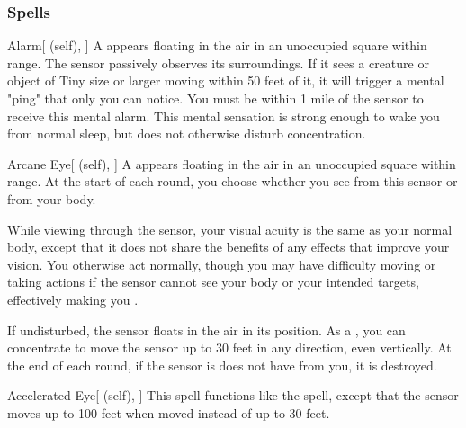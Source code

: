 \subsubsection{Spells}


\lowercase{\hypertarget{spell:Alarm}{}}\label{spell:Alarm}
\begin{attuneability}[\nth{1}]{\hypertarget{spell:Alarm}{Alarm}}[ (self), ]
A  appears floating in the air in an unoccupied square within \rngmed range.
The sensor passively observes its surroundings.
If it sees a creature or object of Tiny size or larger moving within 50 feet of it, it will trigger a mental "ping" that only you can notice.
You must be within 1 mile of the sensor to receive this mental alarm.
This mental sensation is strong enough to wake you from normal sleep, but does not otherwise disturb concentration.
\end{attuneability}
\vspace{0.25em}



\lowercase{\hypertarget{spell:Arcane Eye}{}}\label{spell:Arcane Eye}
\begin{attuneability}[\nth{1}]{\hypertarget{spell:Arcane Eye}{Arcane Eye}}[ (self), ]
A  appears floating in the air in an unoccupied square within \rngmed range.
At the start of each round, you choose whether you see from this sensor or from your body.

While viewing through the sensor, your visual acuity is the same as your normal body, except that it does not share the benefits of any  effects that improve your vision.
You otherwise act normally, though you may have difficulty moving or taking actions if the sensor cannot see your body or your intended targets, effectively making you \blinded.

If undisturbed, the sensor floats in the air in its position.
As a , you can concentrate to move the sensor up to 30 feet in any direction, even vertically.
At the end of each round, if the sensor is does not have  from you, it is destroyed.
\end{attuneability}
\vspace{0.25em}



\lowercase{\hypertarget{spell:Accelerated Eye}{}}\label{spell:Accelerated Eye}
\begin{attuneability}[\nth{2}]{\hypertarget{spell:Accelerated Eye}{Accelerated Eye}}[ (self), ]
This spell functions like the  spell, except that the sensor moves up to 100 feet when moved instead of up to 30 feet.
\end{attuneability}
\vspace{0.25em}



